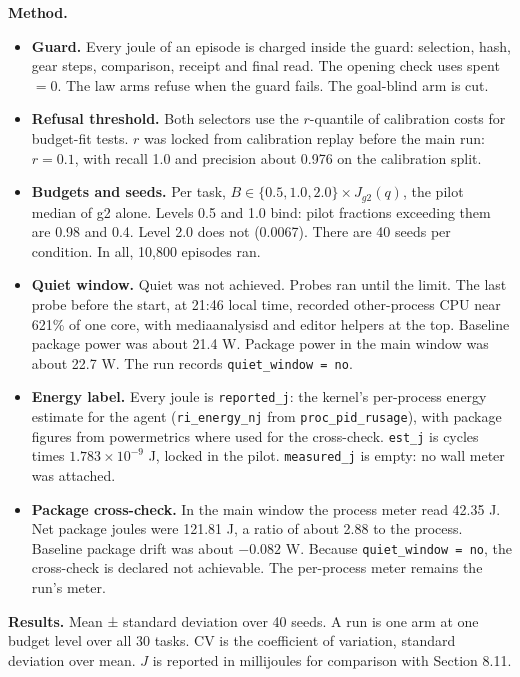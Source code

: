 \documentclass[
  10pt,
]{article}
\providecommand{\tightlist}{%
  \setlength{\itemsep}{0pt}\setlength{\parskip}{0pt}}
\begin{document}
\textbf{Method.}

\begin{itemize}
\tightlist
\item
  \textbf{Guard.} Every joule of an episode is charged inside the guard:
  selection, hash, gear steps, comparison, receipt and final read. The
  opening check uses spent \(= 0\). The law arms refuse when the guard
  fails. The goal-blind arm is cut.
\item
  \textbf{Refusal threshold.} Both selectors use the \(r\)-quantile of
  calibration costs for budget-fit tests. \(r\) was locked from
  calibration replay before the main run: \(r = 0.1\), with recall 1.0
  and precision about 0.976 on the calibration split.
\item
  \textbf{Budgets and seeds.} Per task,
  \(B \in \{0.5, 1.0, 2.0\} \times J_{g2}(q)\), the pilot median of g2
  alone. Levels 0.5 and 1.0 bind: pilot fractions exceeding them are
  0.98 and 0.4. Level 2.0 does not (0.0067). There are 40 seeds per
  condition. In all, 10,800 episodes ran.
\item
  \textbf{Quiet window.} Quiet was not achieved. Probes ran until the
  limit. The last probe before the start, at 21:46 local time, recorded
  other-process CPU near 621\% of one core, with mediaanalysisd and
  editor helpers at the top. Baseline package power was about 21.4 W.
  Package power in the main window was about 22.7 W. The run records
  \texttt{quiet\_window\ =\ no}.
\item
  \textbf{Energy label.} Every joule is \texttt{reported\_j}: the
  kernel's per-process energy estimate for the agent
  (\texttt{ri\_energy\_nj} from \texttt{proc\_pid\_rusage}), with
  package figures from powermetrics where used for the cross-check.
  \texttt{est\_j} is cycles times \(1.783 \times 10^{-9}\) J, locked in
  the pilot. \texttt{measured\_j} is empty: no wall meter was attached.
\item
  \textbf{Package cross-check.} In the main window the process meter
  read 42.35 J. Net package joules were 121.81 J, a ratio of about 2.88
  to the process. Baseline package drift was about \(-0.082\) W. Because
  \texttt{quiet\_window\ =\ no}, the cross-check is declared not
  achievable. The per-process meter remains the run's meter.
\end{itemize}

\textbf{Results.} Mean ± standard deviation over 40 seeds. A run is one
arm at one budget level over all 30 tasks. CV is the coefficient of
variation, standard deviation over mean. \(J\) is reported in
millijoules for comparison with Section 8.11.
\end{document}
